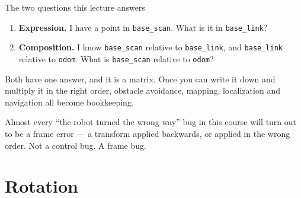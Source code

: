 \documentclass[aspectratio=169]{beamer}
\begin{document}
\begin{frame}{The two questions this lecture answers}
  \vspace{0.3em}
  \begin{enumerate}
    \item \textbf{Expression.} I have a point in \texttt{base\_scan}. What is it in
          \texttt{base\_link}?
    \item \textbf{Composition.} I know \texttt{base\_scan} relative to \texttt{base\_link}, and
          \texttt{base\_link} relative to \texttt{odom}. What is \texttt{base\_scan} relative
          to \texttt{odom}?
  \end{enumerate}

  \vspace{1.0em}
  \small
  Both have one answer, and it is a matrix. Once you can write it down and multiply it in the
  right order, obstacle avoidance, mapping, localization and navigation all become bookkeeping.

  \vspace{0.6em}
  \begin{inthefield}
    \footnotesize
    Almost every ``the robot turned the wrong way'' bug in this course will turn out to be a
    frame error --- a transform applied backwards, or applied in the wrong order. Not a control
    bug. A frame bug.
  \end{inthefield}
\end{frame}

\section{Rotation}
\end{document}
